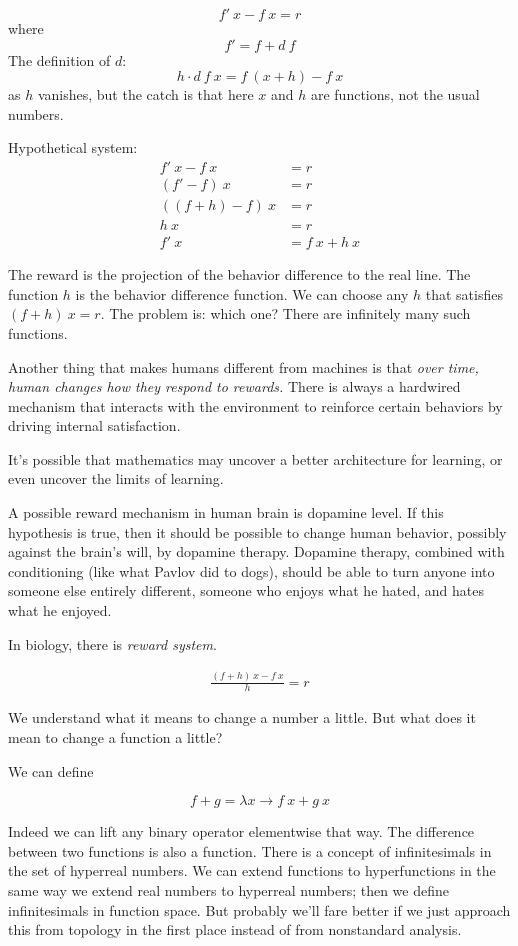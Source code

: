 \[
    f'~x - f~x = r
\]
where
\[
    f' = f + d~f
\]
The definition of \(d\):
\[
    h \cdot d~f~x = f~(x+h) - f~x
\]
as \(h\) vanishes,
but the catch is that
here \(x\) and \(h\) are functions, not the usual numbers.

Hypothetical system:
\begin{align*}
    f'~x - f~x &= r
    \\
    (f' - f)~x &= r
    \\
    ((f + h) - f)~x &= r
    \\
    h~x &= r
    \\
    f'~x &= f~x + h~x
\end{align*}

The reward is the projection of the behavior difference to the real line.
The function \(h\) is the behavior difference function.
We can choose any \(h\) that satisfies \((f + h)~x = r\).
The problem is: which one?
There are infinitely many such functions.

Another thing that makes humans different from machines is that
\emph{over time, human changes how they respond to rewards.}
There is always a hardwired mechanism that interacts with the environment
to reinforce certain behaviors by driving internal satisfaction.

It's possible that mathematics may uncover a better architecture for learning,
or even uncover the limits of learning.

A possible reward mechanism in human brain is dopamine level.
If this hypothesis is true, then it should be possible to change human behavior,
possibly against the brain's will, by dopamine therapy.
Dopamine therapy, combined with conditioning (like what Pavlov did to dogs),
should be able to turn anyone into someone else entirely different,
someone who enjoys what he hated, and hates what he enjoyed.

In biology, there is \emph{reward system}.

\begin{align*}
    \frac{(f + h)~x - f~x}{h} = r
\end{align*}

We understand what it means to change a number a little.
But what does it mean to change a function a little?

We can define

\[
    f + g = \lambda x \to f~x+g~x
\]

Indeed we can lift any binary operator elementwise that way.
The difference between two functions is also a function.
There is a concept of infinitesimals in the set of hyperreal numbers.
We can extend functions to hyperfunctions in the same way
we extend real numbers to hyperreal numbers;
then we define infinitesimals in function space.
But probably we'll fare better if we just approach this from topology
in the first place instead of from nonstandard analysis.


